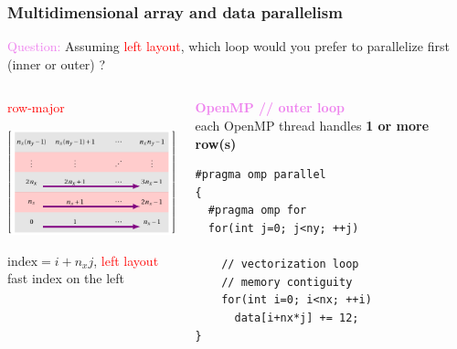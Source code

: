 \begin{frame}[fragile=singleslide]
  \frametitle{Multidimensional array and data parallelism}

  \begin{block}{}
    {\large \textcolor{violet}{Question:}
    Assuming \textcolor{red}{left layout}, which loop would you prefer to parallelize first (inner or outer) ?}    
  \end{block}
  
  \begin{columns}
    \begin{column}{0.48\textwidth}
      \begin{center}
        \textcolor{red}{\large row-major}
        
        \includegraphics[width=5cm]{images/tikz/row-major-openmp}

        $\text{index} = i + n_x j$, \textcolor{red}{left layout}\\
        fast index on the left
      \end{center}
    \end{column}
    \begin{column}{0.48\textwidth}
      \begin{center}
        \textcolor{violet}{\bf OpenMP // outer loop}\\
        each OpenMP thread handles {\bf 1 or more row(s)}
      \end{center}
      \begin{verbatim}
#pragma omp parallel
{
  #pragma omp for
  for(int j=0; j<ny; ++j)

    // vectorization loop
    // memory contiguity
    for(int i=0; i<nx; ++i)
      data[i+nx*j] += 12;
}
      \end{verbatim}
    \end{column}
    \hfill
  \end{columns}
\end{frame}

